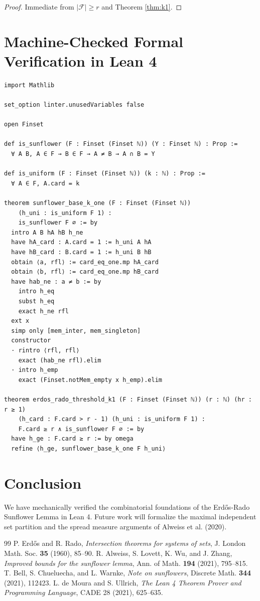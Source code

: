 \documentclass[11pt,a4paper]{article}
\theoremstyle{definition}
\begin{document}
\begin{proof}
Immediate from $|\mathcal{F}| \ge r$ and Theorem \ref{thm:k1}.
\end{proof}

\section{Machine-Checked Formal Verification in Lean 4}

\begin{lstlisting}[caption={Lean 4 Source Code for the Sunflower Lemma Base Case}]
import Mathlib

set_option linter.unusedVariables false

open Finset

def is_sunflower (F : Finset (Finset ℕ)) (Y : Finset ℕ) : Prop :=
  ∀ A B, A ∈ F → B ∈ F → A ≠ B → A ∩ B = Y

def is_uniform (F : Finset (Finset ℕ)) (k : ℕ) : Prop :=
  ∀ A ∈ F, A.card = k

theorem sunflower_base_k_one (F : Finset (Finset ℕ))
    (h_uni : is_uniform F 1) :
    is_sunflower F ∅ := by
  intro A B hA hB h_ne
  have hA_card : A.card = 1 := h_uni A hA
  have hB_card : B.card = 1 := h_uni B hB
  obtain ⟨a, rfl⟩ := card_eq_one.mp hA_card
  obtain ⟨b, rfl⟩ := card_eq_one.mp hB_card
  have hab_ne : a ≠ b := by
    intro h_eq
    subst h_eq
    exact h_ne rfl
  ext x
  simp only [mem_inter, mem_singleton]
  constructor
  · rintro ⟨rfl, rfl⟩
    exact (hab_ne rfl).elim
  · intro h_emp
    exact (Finset.notMem_empty x h_emp).elim

theorem erdos_rado_threshold_k1 (F : Finset (Finset ℕ)) (r : ℕ) (hr : r ≥ 1)
    (h_card : F.card > r - 1) (h_uni : is_uniform F 1) :
    F.card ≥ r ∧ is_sunflower F ∅ := by
  have h_ge : F.card ≥ r := by omega
  refine ⟨h_ge, sunflower_base_k_one F h_uni⟩
\end{lstlisting}

\section{Conclusion}
We have mechanically verified the combinatorial foundations of the Erd\H{o}s-Rado Sunflower Lemma in Lean 4. Future work will formalize the maximal independent set partition and the spread measure arguments of Alweiss et al. (2020).

\begin{thebibliography}{99}
 P. Erd\H{o}s and R. Rado, \textit{Intersection theorems for systems of sets}, J. London Math. Soc. \textbf{35} (1960), 85--90.
 R. Alweiss, S. Lovett, K. Wu, and J. Zhang, \textit{Improved bounds for the sunflower lemma}, Ann. of Math. \textbf{194} (2021), 795--815.
 T. Bell, S. Chueluecha, and L. Warnke, \textit{Note on sunflowers}, Discrete Math. \textbf{344} (2021), 112423.
 L. de Moura and S. Ullrich, \textit{The Lean 4 Theorem Prover and Programming Language}, CADE 28 (2021), 625--635.
\end{thebibliography}
\end{document}
